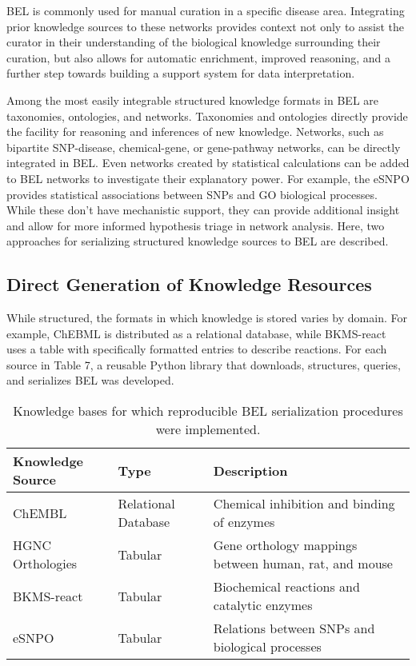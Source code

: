 BEL is commonly used for manual curation in a specific disease area. Integrating prior knowledge sources to these networks provides context not only to assist the curator in their understanding of the biological knowledge surrounding their curation, but also allows for automatic enrichment, improved reasoning, and a further step towards building a support system for data interpretation. 

Among the most easily integrable structured knowledge formats in BEL are taxonomies, ontologies, and networks. Taxonomies and ontologies directly provide the facility for reasoning and inferences of new knowledge. Networks, such as bipartite \ac{SNP}-disease, chemical-gene, or gene-pathway networks, can be directly integrated in \ac{BEL}. Even networks created by statistical calculations can be added to \ac{BEL} networks to investigate their explanatory power. For example, the \ac{eSNPO} provides statistical associations between \ac{SNP}s and \ac{GO} biological processes. While these don't have mechanistic support, they can provide additional insight and allow for more informed hypothesis triage in network analysis. Here, two approaches for serializing structured knowledge sources to \ac{BEL} are described.

\subsection{Direct Generation of Knowledge Resources}

While structured, the formats in which knowledge is stored varies by domain. For example, ChEBML \cite{Gaulton2012} is distributed as a relational database, while BKMS-react \cite{Schomburg2017} uses a table with specifically formatted entries to describe reactions. For each source in Table 7, a reusable Python library that downloads, structures, queries, and serializes \ac{BEL} was developed.

\begin{table}
\centering
\caption[Direct Knowledge Resource Generation]{Knowledge bases for which reproducible BEL serialization procedures were implemented.}
\label{tab:direct_knowledge_generation}
\def\arraystretch{1.5}
\begin{tabular}{p{25mm} p{20mm} p{45mm}}
Knowledge Source & Type & Description \\
\hline
ChEMBL & Relational Database & Chemical inhibition and binding of enzymes \\
HGNC Orthologies & Tabular & Gene orthology mappings between human, rat, and mouse \\
BKMS-react & Tabular & Biochemical reactions and catalytic enzymes \\
\ac{eSNPO} & Tabular & Relations between \ac{SNP}s and biological processes
\end{tabular}
\end{table}

